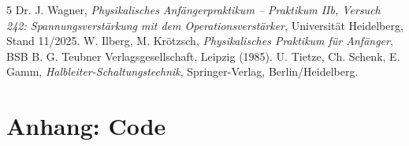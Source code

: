 \documentclass[12pt,a4paper,titlepage]{scrartcl}
\numberwithin{equation}{section}
\numberwithin{table}{section}
\numberwithin{figure}{section}
\begin{document}

\clearpage

\listoffigures

\listoftables

\begin{thebibliography}{5}
     Dr. J. Wagner, \emph{Physikalisches Anfängerpraktikum -- Praktikum IIb, Versuch 242: Spannungsverstärkung mit dem Operationsverstärker}, Universität Heidelberg, Stand 11/2025.
     W. Ilberg, M. Krötzsch, \emph{Physikalisches Praktikum für Anfänger}, BSB B. G. Teubner Verlagsgesellschaft, Leipzig (1985).
     U. Tietze, Ch. Schenk, E. Gamm, \emph{Halbleiter-Schaltungstechnik}, Springer-Verlag, Berlin/Heidelberg.
\end{thebibliography}

\appendix

\section{Anhang: Code}


\end{document}
